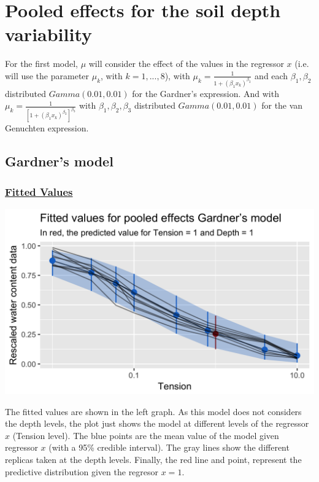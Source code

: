 \documentclass{article}
\begin{document}
\section{Pooled effects for the soil depth variability}
For the first model, $\mu$ will consider the effect of the values in the regressor $x$ (i.e. will use the parameter $\mu_k$, with $k = 1,..., 8$), with $\mu_k = \frac{1}{1+(\beta_1 x_k)^{\beta_2}}$ and each $\beta_1, \beta_2$ distributed $Gamma(0.01, 0.01)$ for the Gardner’s expression. And with $\mu_k = \frac{1}{[1+(\beta_1 x_k)^{\beta_2}]^{\beta_3}}$ with $\beta_1, \beta_2, \beta_3$ distributed $Gamma(0.01, 0.01)$ for the van Genuchten expression.

\subsection*{Gardner's model}
\subsubsection*{\underline{Fitted Values}}

\begin{minipage}{0.50\textwidth}
\includegraphics[width=\linewidth]{pooled_2pars_pred.png}
\end{minipage}
\begin{minipage}{0.50\textwidth}
The fitted values are shown in the left graph. As this model does not considers the depth levels, the plot just shows the model at different levels of the regressor $x$ (Tension level). The blue points are the mean value of the model given regressor $x$ (with a 95\% credible interval). The gray lines show the different replicas taken at the depth levels. Finally, the red line and point, represent the predictive distribution given the regresor $x=1$.
\end{minipage}
\end{document}
